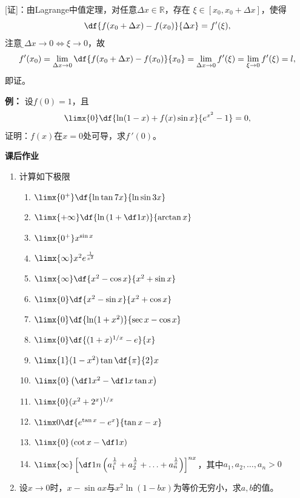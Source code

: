 [证]：由Lagrange中值定理，对任意$\Delta x\in\mathbb{R}$，存在
$\xi\in[x_0,x_0+\Delta x]$，使得
$$\df{f(x_0+\Delta x)-f(x_0)}{\Delta x}=f'(\xi),$$
注意到{\b$\Delta x\to 0\Leftrightarrow\xi\to0$}，故
$$f'(x_0)=\lim\limits_{\Delta x\to 0}\df{f(x_0+\Delta x)-f(x_0)}{x_0}
=\lim\limits_{\Delta x\to 0}f'(\xi)=\lim\limits_{\xi\to 0}f'(\xi)=l,$$
即证。

{\bf 例：}
设$f(0)=1$，且
$$\limx{0}\df{\ln(1-x)+f(x)\sin x}{e^{x^2}-1}=0,$$
证明：$f(x)$在$x=0$处可导，求$f\,'(0)$。

\begin{ext}
	{\bf 课后作业}
	
	\begin{enumerate}
	  \item 计算如下极限
		\begin{enumerate}[(1)]
		  \item $\limx{0^+}\df{\ln\tan 7x}{\ln\sin 3x}$
		  \item $\limx{+\infty}\df{\ln\left(1+\df1x\right)}{\arctan x}$
		  \item $\limx{0^+}x^{\sin x}$
		  \item $\limx{\infty}x^2e^{\frac1{x^2}}$
		  \item $\limx{\infty}\df{x^2-\cos x}{x^2+\sin x}$
		  \item $\limx{0}\df{x^2-\sin x}{x^2+\cos x}$
		  \item $\limx{0}\df{\ln(1+x^2)}{\sec x-\cos x}$
  		  \item $\limx{0}\df{(1+x)^{1/x}-e}{x}$ 
   		  \item $\limx{1}(1-x^2)\tan\df{\pi}{2}x$ 
  		  \item $\limx{0}\left(\df 1{x^2}-\df 1{x\tan x}\right)$ 
  		  \item $\limx{0}(x^2+2^x)^{1/x}$ 
  		  \item $\limx0\df{e^{\tan x}-e^x}{\tan x-x}$
  		  \item $\limx{0}\left(\cot x-\df 1x\right)$ 
  		  \item $\limx{\infty}\left[\df1n\left(a_1^{\frac1x}+a_2^{\frac1x}
  		  +\ldots+a_n^{\frac1x}\right)\right]^{nx}$，其中$a_1,a_2,\ldots,a_n>0$
		\end{enumerate}
	  \item 设$x\to 0$时，$x-\sin ax$与$x^2\ln(1-bx)$为等价无穷小，求$a,b$的值。
	\end{enumerate}
\end{ext}

